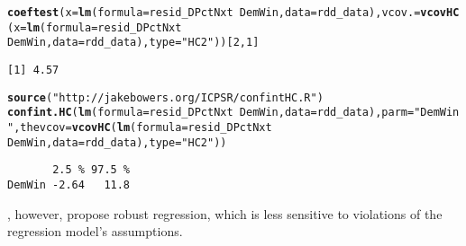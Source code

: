 \documentclass[11pt,leqno]{article}\usepackage[]{graphicx}\usepackage[]{color}
\makeatletter
\newcommand{\hlnum}[1]{\textcolor[rgb]{0.686,0.059,0.569}{#1}}%
\newcommand{\hlstr}[1]{\textcolor[rgb]{0.192,0.494,0.8}{#1}}%
\newcommand{\hlopt}[1]{\textcolor[rgb]{0,0,0}{#1}}%
\newcommand{\hlstd}[1]{\textcolor[rgb]{0.345,0.345,0.345}{#1}}%
\newcommand{\hlkwc}[1]{\textcolor[rgb]{0.333,0.667,0.333}{#1}}%
\newcommand{\hlkwd}[1]{\textcolor[rgb]{0.737,0.353,0.396}{\textbf{#1}}}%
\newenvironment{kframe}{%
 \def\at@end@of@kframe{}%
 \ifinner\ifhmode%
  \def\at@end@of@kframe{\end{minipage}}%
  \begin{minipage}{\columnwidth}%
 \fi\fi%
 \def\FrameCommand##1{\hskip\@totalleftmargin \hskip-\fboxsep
 \colorbox{shadecolor}{##1}\hskip-\fboxsep
     \hskip-\linewidth \hskip-\@totalleftmargin \hskip\columnwidth}%
 \MakeFramed {\advance\hsize-\width
   \@totalleftmargin\z@ \linewidth\hsize
   \@setminipage}}%
 {\par\unskip\endMakeFramed%
 \at@end@of@kframe}
\newenvironment{knitrout}{}{} %
\theoremstyle{newstyle}
\makeatother
\begin{document}
\begin{knitrout}\footnotesize
{}\color{fgcolor}\begin{kframe}
\begin{alltt}
\hlkwd{coeftest}\hlstd{(}\hlkwc{x} \hlstd{=} \hlkwd{lm}\hlstd{(}\hlkwc{formula} \hlstd{= resid_DPctNxt} \hlopt{~} \hlstd{DemWin,} \hlkwc{data} \hlstd{= rdd_data),} \hlkwc{vcov.} \hlstd{=} \hlkwd{vcovHC}\hlstd{(}\hlkwc{x} \hlstd{=} \hlkwd{lm}\hlstd{(}\hlkwc{formula} \hlstd{= resid_DPctNxt} \hlopt{~}
    \hlstd{DemWin,} \hlkwc{data} \hlstd{= rdd_data),} \hlkwc{type} \hlstd{=} \hlstr{"HC2"}\hlstd{))[}\hlnum{2}\hlstd{,} \hlnum{1}\hlstd{]}
\end{alltt}
\begin{verbatim}
[1] 4.57
\end{verbatim}
\begin{alltt}
\hlkwd{source}\hlstd{(}\hlstr{"http://jakebowers.org/ICPSR/confintHC.R"}\hlstd{)}
\hlkwd{confint.HC}\hlstd{(}\hlkwd{lm}\hlstd{(}\hlkwc{formula} \hlstd{= resid_DPctNxt} \hlopt{~} \hlstd{DemWin,} \hlkwc{data} \hlstd{= rdd_data),} \hlkwc{parm} \hlstd{=} \hlstr{"DemWin"}\hlstd{,} \hlkwc{thevcov} \hlstd{=} \hlkwd{vcovHC}\hlstd{(}\hlkwd{lm}\hlstd{(}\hlkwc{formula} \hlstd{= resid_DPctNxt} \hlopt{~}
    \hlstd{DemWin,} \hlkwc{data} \hlstd{= rdd_data),} \hlkwc{type} \hlstd{=} \hlstr{"HC2"}\hlstd{))}
\end{alltt}
\begin{verbatim}
       2.5 % 97.5 %
DemWin -2.64   11.8
\end{verbatim}
\end{kframe}
\end{knitrout}

\citet{saleshansen2018}, however, propose robust regression, which is less sensitive to violations of the regression model's assumptions.
\end{document}
